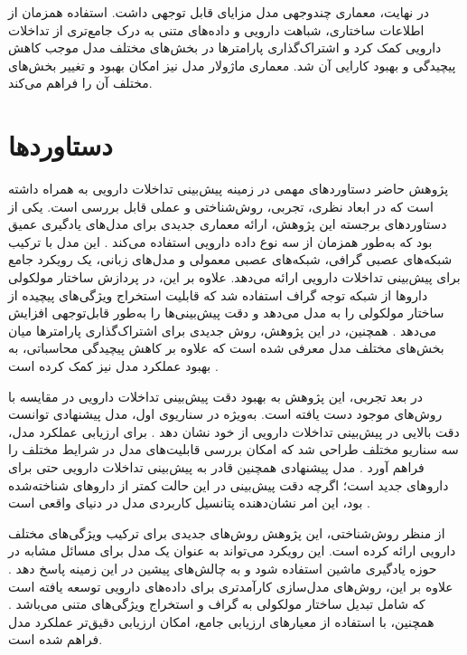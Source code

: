 در نهایت، معماری چندوجهی مدل مزایای قابل توجهی داشت. استفاده همزمان از اطلاعات ساختاری، شباهت دارویی و داده‌های متنی به درک جامع‌تری از تداخلات دارویی کمک کرد و اشتراک‌گذاری پارامترها در بخش‌های مختلف مدل موجب کاهش پیچیدگی و بهبود کارایی آن شد. معماری ماژولار مدل نیز امکان بهبود و تغییر بخش‌های مختلف آن را فراهم می‌کند.

\section{دستاوردها}

پژوهش حاضر دستاوردهای مهمی در زمینه پیش‌بینی تداخلات دارویی به همراه داشته است که در ابعاد نظری، تجربی، روش‌شناختی و عملی قابل بررسی است. یکی از دستاوردهای برجسته این پژوهش، ارائه معماری جدیدی برای مدل‌های یادگیری عمیق بود که به‌طور همزمان از سه نوع داده دارویی استفاده می‌کند \cite{ref_li2023}. این مدل با ترکیب شبکه‌های عصبی گرافی، شبکه‌های عصبی معمولی و مدل‌های زبانی، یک رویکرد جامع برای پیش‌بینی تداخلات دارویی ارائه می‌دهد. علاوه بر این، در پردازش ساختار مولکولی داروها از شبکه توجه گراف استفاده شد که قابلیت استخراج ویژگی‌های پیچیده از ساختار مولکولی را به مدل می‌دهد و دقت پیش‌بینی‌ها را به‌طور قابل‌توجهی افزایش می‌دهد \cite{ref_nyamabo2021}. همچنین، در این پژوهش، روش جدیدی برای اشتراک‌گذاری پارامترها میان بخش‌های مختلف مدل معرفی شده است که علاوه بر کاهش پیچیدگی محاسباتی، به بهبود عملکرد مدل نیز کمک کرده است \cite{ref_dai2020}.

در بعد تجربی، این پژوهش به بهبود دقت پیش‌بینی تداخلات دارویی در مقایسه با روش‌های موجود دست یافته است. به‌ویژه در سناریوی اول، مدل پیشنهادی توانست دقت بالایی در پیش‌بینی تداخلات دارویی از خود نشان دهد \cite{ref_he2023}. برای ارزیابی عملکرد مدل، سه سناریو مختلف طراحی شد که امکان بررسی قابلیت‌های مدل در شرایط مختلف را فراهم آورد \cite{ref_deng2020}. مدل پیشنهادی همچنین قادر به پیش‌بینی تداخلات دارویی حتی برای داروهای جدید است؛ اگرچه دقت پیش‌بینی در این حالت کمتر از داروهای شناخته‌شده بود، این امر نشان‌دهنده پتانسیل کاربردی مدل در دنیای واقعی است \cite{ref_shi2024}.

از منظر روش‌شناختی، این پژوهش روش‌های جدیدی برای ترکیب ویژگی‌های مختلف دارویی ارائه کرده است. این رویکرد می‌تواند به عنوان یک مدل برای مسائل مشابه در حوزه یادگیری ماشین استفاده شود و به چالش‌های پیشین در این زمینه پاسخ دهد \cite{ref_lin2022}. علاوه بر این، روش‌های مدل‌سازی کارآمدتری برای داده‌های دارویی توسعه یافته است که شامل تبدیل ساختار مولکولی به گراف و استخراج ویژگی‌های متنی می‌باشد \cite{ref_weininger1988}. همچنین، با استفاده از معیارهای ارزیابی جامع، امکان ارزیابی دقیق‌تر عملکرد مدل فراهم شده است.

